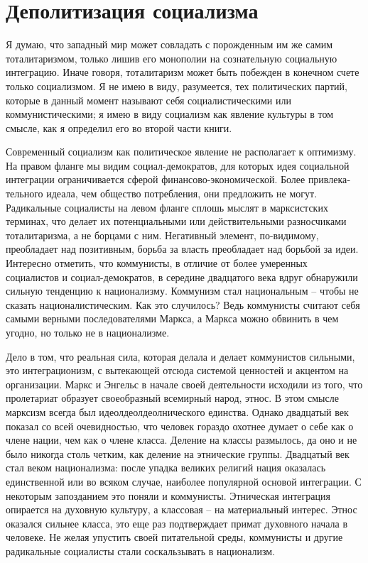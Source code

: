 \documentclass{book}
\begin{document}
\section{Деполитизация социализма}

Я думаю, что западный мир может совладать с порожденным им же самим тоталитаризмом, только лишив его монополии на сознательную социальную интеграцию. Иначе говоря, тота­литаризм может быть побежден в конечном счете только со­циализмом. Я не имею в виду, разумеется, тех политических партий, которые в данный момент называют себя социалисти­ческими или коммунистическими; я имею в виду социализм как явление культуры в том смысле, как я определил его во второй части книги.

Современный социализм как политическое явление не рас­полагает к оптимизму. На правом фланге мы видим социал-демократов, для которых идея социальной интеграции ограни­чивается сферой финансово-экономической. Более привлека­тельного идеала, чем общество потребления, они предложить не могут. Радикальные социалисты на левом фланге сплошь мыс­лят в марксистских терминах, что делает их потенциальными или действительными разносчиками тоталитаризма, а не борца­ми с ним. Негативный элемент, по-видимому, преобладает над позитивным, борьба за власть преобладает над борьбой за идеи.
Интересно отметить, что коммунисты, в отличие от более умеренных социалистов и социал-демократов, в середине двад­цатого века вдруг обнаружили сильную тенденцию к национа­лизму. Коммунизм стал национальным -- чтобы не сказать на­ционалистическим. Как это случилось? Ведь коммунисты счита­ют себя самыми верными последователями Маркса, а Маркса можно обвинить в чем угодно, но только не в национализме.

Дело в том, что реальная сила, которая делала и делает ком­мунистов сильными, это интеграционизм, с вытекающей отсю­да системой ценностей и акцентом на организации. Маркс и Эн­гельс в начале своей деятельности исходили из того, что проле­тариат образует своеобразный всемирный народ, этнос. В этом смысле марксизм всегда был идеолдеолдеолнического единства. Однако двадцатый век показал со всей очевидностью, что чело­век гораздо охотнее думает о себе как о члене нации, чем как о члене класса. Деление на классы размылось, да оно и не было никогда столь четким, как деление на этнические группы. Двадцатый век стал веком национализма: после упадка великих религий нация оказалась единственной или во всяком случае, наиболее популярной основой интеграции. С некоторым за­позданием это поняли и коммунисты. Этническая интеграция опирается на духовную культуру, а классовая -- на материаль­ный интерес. Этнос оказался сильнее класса, это еще раз подт­верждает примат духовного начала в человеке. Не желая упу­стить своей 
питательной среды, коммунисты и другие радикаль­ные социалисты стали соскальзывать в национализм.
\end{document}
